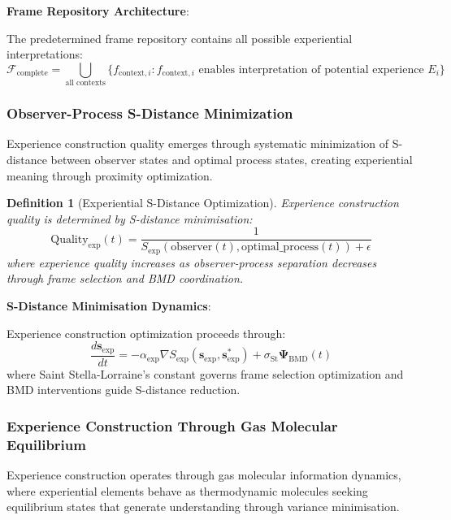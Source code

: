 \documentclass{article}
\newtheorem{definition}[theorem]{Definition}
\begin{document}
\textbf{Frame Repository Architecture}:

The predetermined frame repository contains all possible experiential interpretations:
\begin{equation}
\mathcal{F}_{\text{complete}} = \bigcup_{\text{all contexts}} \{f_{\text{context},i} : f_{\text{context},i} \text{ enables interpretation of potential experience } E_i\}
\end{equation}

\subsubsection{Observer-Process S-Distance Minimization}

Experience construction quality emerges through systematic minimization of S-distance between observer states and optimal process states, creating experiential meaning through proximity optimization.

\begin{definition}[Experiential S-Distance Optimization]
Experience construction quality is determined by S-distance minimisation:
\begin{equation}
\text{Quality}_{\text{exp}}(t) = \frac{1}{S_{\text{exp}}(\text{observer}(t), \text{optimal\_process}(t)) + \epsilon}
\end{equation}
where experience quality increases as observer-process separation decreases through frame selection and BMD coordination.
\end{definition}

\textbf{S-Distance Minimisation Dynamics}:

Experience construction optimization proceeds through:
\begin{equation}
\frac{d\mathbf{s}_{\text{exp}}}{dt} = -\alpha_{\text{exp}} \nabla S_{\text{exp}}(\mathbf{s}_{\text{exp}}, \mathbf{s}_{\text{exp}}^*) + \sigma_{\text{St}} \mathbf{\Psi}_{\text{BMD}}(t)
\end{equation}
where Saint Stella-Lorraine's constant governs frame selection optimization and BMD interventions guide S-distance reduction.

\subsubsection{Experience Construction Through Gas Molecular Equilibrium}

Experience construction operates through gas molecular information dynamics, where experiential elements behave as thermodynamic molecules seeking equilibrium states that generate understanding through variance minimisation.
\end{document}
